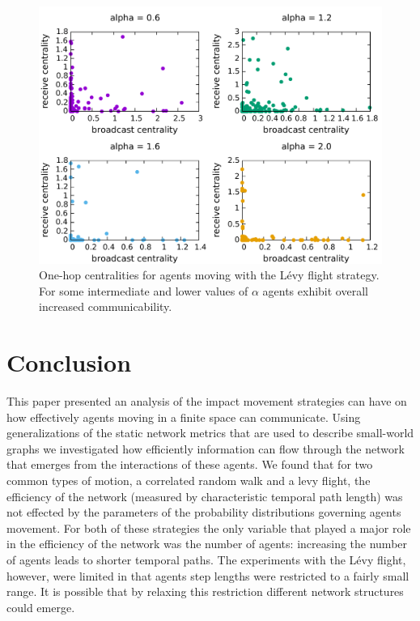 \documentclass[conference]{IEEEtran}
\begin{document}
\begin{figure}
  \includegraphics[width=\columnwidth]{levy-onehop-comm.pdf}
  \caption{One-hop centralities for agents moving with the L\'evy
    flight strategy. For some intermediate and lower values of
    $\alpha$ agents exhibit overall increased communicability.}
  \label{fig:levy-comm}
\end{figure}

\section{Conclusion}
This paper presented an analysis of the impact movement strategies can
have on how effectively agents moving in a finite space can
communicate. Using generalizations of the static network metrics that
are used to describe small-world graphs we investigated how
efficiently information can flow through the network that emerges from
the interactions of these agents. We found that for two common types
of motion, a correlated random walk and a levy flight, the efficiency
of the network (measured by characteristic temporal path length) was
not effected by the parameters of the probability distributions
governing agents movement. For both of these strategies the only
variable that played a major role in the efficiency of the network was
the number of agents: increasing the number of agents leads to shorter
temporal paths. The experiments with the L\'evy flight, however, were
limited in that agents step lengths were restricted to a fairly small
range. It is possible that by relaxing this restriction different
network structures could emerge.
\end{document}
